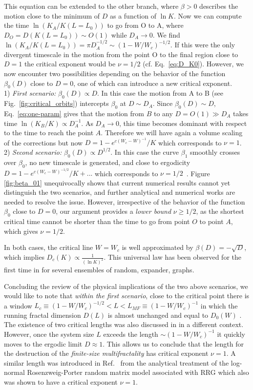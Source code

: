 \documentclass[reprint,aps,prl,superscriptaddress,english,nolongbibliography]{revtex4-2}
\begin{document}
{This equation can be extended to the other branch, where $\beta>0$ describes the motion close to the minimum of $D$ as a function of $\ln K$. Now we can compute the time $\ln(K_A/K(L=L_{0}))$ to go from O to A, where $D_{O}=D(K(L=L_{0}))\sim O(1)$ while $D_A\to 0$. We find $\ln(K_{A}/K(L=L_{0}))=\pi D_A^{-1/2}\sim (1-W/W_c)^{-1/2}$. If this were the only divergent timescale in the motion from the point O to the final region close to $D=1$ the critical exponent would be $\nu=1/2$ (cf. Eq.~\eqref{eq:D_K0}). However, we now encounter two possibilities depending on the behavior of the function $\beta_0(D)$ close to $D=0$, one of which can introduce a new critical exponent.\\
1) {\it First scenario:} $\beta_0(D)\propto D$. In this case the motion from A to B (see Fig.~\ref{fig:critical_orbits}) intercepts $\beta_0$ at $D\sim D_A$. Since $\beta_0(D)\sim D$, Eq.~\eqref{eq:one-param} gives that the motion from $B$ to any $D=O(1)\gg D_A$ takes time $\ln(K_B/K)\propto D_A^{-1}$. As $D_A\to 0$, this time becomes dominant with respect to the time to reach the point $A$. Therefore we will have again a volume scaling of the corrections but now $D=1-e^{c(W_c-W)^{-1}}/K$ which corresponds to $\nu=1$.\\
2) {\it Second scenario:} $\beta_0(D)\propto D^{1/2}$. In this case the curve $\beta_1$ smoothly crosses over $\beta_0$, no new timescale is generated, and close to ergodicity $D=1-e^{c(W_c-W)^{-1/2}}/K+...$ which corresponds to $\nu=1/2$~\cite{tikhonov2021AndersonMBL}. Figure \ref{fig:beta_01} unequivocally shows that current numerical results cannot yet distinguish the two scenarios, and further analytical and numerical works are needed to resolve the issue. However, irrespective of the behavior of the function $\beta_0$ close to $D=0$, our argument provides a {\it lower bound} $\nu\geq 1/2$, as the shortest critical time cannot be shorter than the time to go from point $O$ to point $A$, which gives $\nu=1/2$. 

In both cases, the critical line $W=W_c$ is well approximated by $\beta(D)=-\sqrt{D}$, which implies $D_c(K)\propto\frac{1}{(\ln K)^2}$. This universal law has been observed for the first time in \cite{sierant2023universality} for several ensembles of random, expander, graphs.

Concluding the review of the physical implications of the two above scenarios, we would like to note that {\it within the first scenario}, close to the critical point there is a window $L_{c}\equiv(1-W/W_c)^{-1/2}<L<L_{MF}\equiv (1-W/W_c)^{-1}$ in which the running fractal dimension $D(L)$ is almost unchanged and equal to $D_{0}(W)$ \cite{sierant2023universality}. The existence of two critical lengths was also discussed in \cite{Mata2020two} in a different context. However, once the system size $L$ exceeds the length $\sim (1-W/W_c)^{-1}$ it quickly moves to the ergodic limit $D\approx 1$. This allows us to conclude that the length for the destruction of the {\it finite-size multifractality} has critical exponent $\nu=1$. A similar length was introduced in Ref.~\cite{Khay-Krav2021} from the analytical treatment of the log-normal Rosenzweig-Porter random matrix model associated with RRG which also was shown to have a critical exponent $\nu=1$.

}
\end{document}
